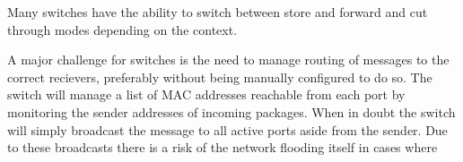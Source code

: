 Many switches have the ability to switch between store and forward and cut through modes depending on the context.

A major challenge for switches is the need to manage routing of messages to the correct recievers, preferably without being manually configured to do so. The switch will manage a list of MAC addresses reachable from each port by monitoring the sender addresses of incoming packages. When in doubt the switch will simply broadcast the message to all active ports aside from the sender. Due to these broadcasts there is a risk of the network flooding itself in cases where 

